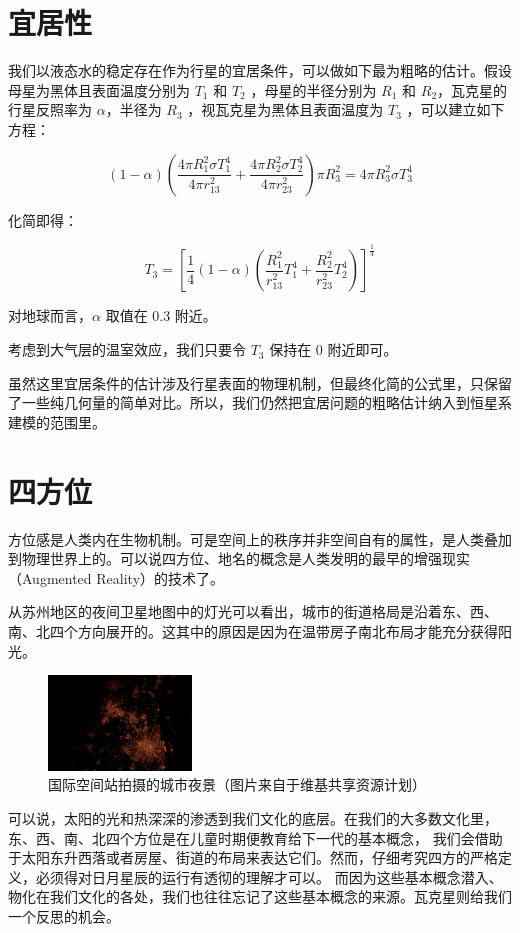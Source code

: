 \documentclass[a4paper,10.5pt]{book}
\begin{document}
\section{宜居性}

我们以液态水的稳定存在作为行星的宜居条件，可以做如下最为粗略的估计。假设母星为黑体且表面温度分别为 $T_1$ 和 $T_2$ ，母星的半径分别为 $R_1$ 和 $R_2$，瓦克星的行星反照率为 $\alpha$，半径为 $R_3$ ，视瓦克星为黑体且表面温度为 $T_3$  ，可以建立如下方程：

$$\left ( 1 - \alpha \right ) \left(  \frac{4 \pi R_1^2 \sigma T_1^4} {4 \pi r_{13}^2} + \frac{4 \pi R_2^2 \sigma T_2^4} {4 \pi r_{23}^2} \right ) \pi R_3^2= 4 \pi R_3^2 \sigma T_3^4$$

化简即得：

$$T_3 = \left[ \frac{1}{4} \left( 1 - \alpha \right ) \left( \frac{R_1^2}{r_{13}^2} T_1^4 + \frac{R_2^2}{r_{23}^2} T_2^4 \right ) \right ]^{\frac{1}{4}}$$

对地球而言，$\alpha$ 取值在 0.3 附近。

考虑到大气层的温室效应，我们只要令 $T_3$ 保持在 0 附近即可。

虽然这里宜居条件的估计涉及行星表面的物理机制，但最终化简的公式里，只保留了一些纯几何量的简单对比。所以，我们仍然把宜居问题的粗略估计纳入到恒星系建模的范围里。

\section{四方位}

方位感是人类内在生物机制。可是空间上的秩序并非空间自有的属性，是人类叠加到物理世界上的。可以说四方位、地名的概念是人类发明的最早的增强现实（Augmented Reality）的技术了。

从苏州地区的夜间卫星地图中的灯光可以看出，城市的街道格局是沿着东、西、南、北四个方向展开的。这其中的原因是因为在温带房子南北布局才能充分获得阳光。

\begin{figure}[ht]
\centering
\includegraphics[width=1.5in]{images/4_01-ISS-30_Nighttime_view_of_Shanghai.jpg}
\caption{国际空间站拍摄的城市夜景（图片来自于维基共享资源计划）}
\end{figure}

可以说，太阳的光和热深深的渗透到我们文化的底层。在我们的大多数文化里，东、西、南、北四个方位是在儿童时期便教育给下一代的基本概念，
我们会借助于太阳东升西落或者房屋、街道的布局来表达它们。然而，仔细考究四方的严格定义，必须得对日月星辰的运行有透彻的理解才可以。
而因为这些基本概念潜入、物化在我们文化的各处，我们也往往忘记了这些基本概念的来源。瓦克星则给我们一个反思的机会。
\end{document}
